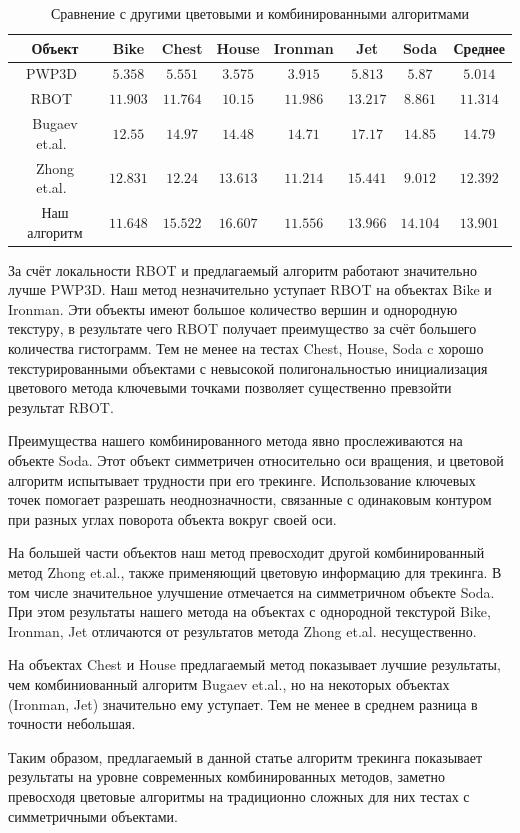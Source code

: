 \begin{table}[h]
\caption{\label{tab:analogues}Сравнение с другими цветовыми и комбинированными
алгоритмами}
\begin{center}
\begin{tabular}{|c|c|c|c|c|c|c|c|}
\hline
Объект & Bike & Chest & House & Ironman & Jet & Soda & Среднее \\
\hline
PWP3D~\cite{PWP3D} & $5.358$ & $5.551$ & $3.575$ &
$3.915$ & $5.813$ & $5.87$ & $5.014$ \\
\hline
RBOT~\cite{Tjaden2018} & $11.903$ & $11.764$ & $10.15$ &
$11.986$ & $13.217$ & $8.861$ & $11.314$ \\
\hline
Bugaev et.al.~\cite{Bugaev_2018_ECCV} & $12.55$ & $14.97$ & $14.48$ &
$\mathbf{14.71}$ & $\mathbf{17.17}$ & $\mathbf{14.85}$ & $\mathbf{14.79}$ \\
\hline
Zhong et.al.~\cite{Zhong2020} & $\mathbf{12.831}$ & $12.24$ & $13.613$ &
$11.214$ & $15.441$ & $9.012$ & $12.392$ \\
\hline
Наш алгоритм & $11.648$ & $\mathbf{15.522}$ & $\mathbf{16.607}$ & $11.556$ &
$13.966$ & $14.104$
& $13.901$ \\
\hline
\end{tabular}
\end{center}
\end{table}


За счёт локальности RBOT и предлагаемый алгоритм работают значительно лучше
PWP3D.
Наш метод незначительно уступает RBOT на объектах Bike и Ironman. Эти объекты
имеют большое количество вершин и однородную текстуру, в результате чего RBOT
получает преимущество за счёт большего количества гистограмм.
Тем не менее на тестах Chest, House, Soda c хорошо текстурированными объектами
с невысокой полигональностью инициализация цветового метода
ключевыми точками позволяет существенно превзойти результат RBOT.

Преимущества нашего комбинированного метода явно прослеживаются на объекте Soda.
Этот объект симметричен относительно оси вращения, и цветовой алгоритм
испытывает трудности при его трекинге.
Использование ключевых точек помогает разрешать неоднозначности, связанные с
одинаковым контуром при разных углах поворота объекта вокруг своей оси.

На большей части объектов наш метод превосходит другой комбинированный
метод Zhong et.al., также применяющий цветовую информацию для трекинга.
В том числе значительное улучшение отмечается на симметричном объекте Soda.
При этом результаты нашего метода на объектах с однородной текстурой Bike,
Ironman,
Jet отличаются от результатов метода Zhong et.al. несущественно.

На объектах Chest и House предлагаемый метод показывает лучшие результаты, чем
комбиниованный алгоритм Bugaev et.al., но на некоторых объектах (Ironman, Jet)
значительно ему уступает. Тем не менее в среднем разница в точности небольшая.

Таким образом, предлагаемый в данной статье алгоритм трекинга показывает
результаты на уровне современных комбинированных методов, заметно превосходя
цветовые алгоритмы на традиционно сложных для них тестах с симметричными
объектами.
